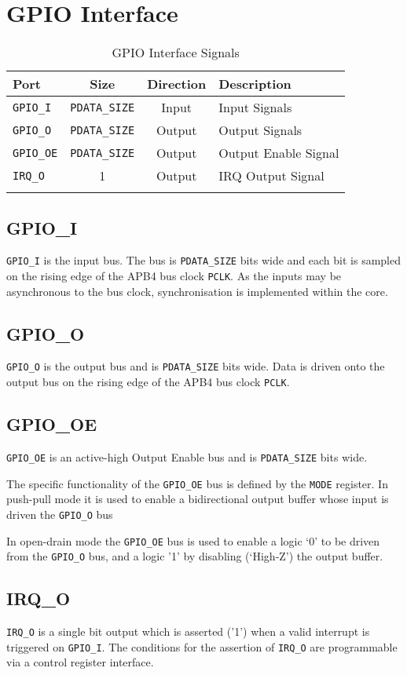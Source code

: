 \section{GPIO Interface}\label{gpio-interface}

\begin{longtable}[]{@{}lccl@{}}
\toprule
Port & Size & Direction & Description\tabularnewline
\midrule
\endhead
\texttt{GPIO\_I} & \texttt{PDATA\_SIZE} & Input & Input Signals\tabularnewline
\texttt{GPIO\_O} & \texttt{PDATA\_SIZE} & Output & Output Signals\tabularnewline
\texttt{GPIO\_OE} & \texttt{PDATA\_SIZE} & Output & Output Enable Signal\tabularnewline
\texttt{IRQ\_O} & 1 & Output & IRQ Output Signal\tabularnewline
\bottomrule
\caption{GPIO Interface Signals}
\end{longtable}

\subsection{GPIO\_I}\label{gpio_i}

\texttt{GPIO\_I} is the input bus. The bus is \texttt{PDATA\_SIZE} bits wide and each bit
is sampled on the rising edge of the APB4 bus clock \texttt{PCLK}. As the inputs
may be asynchronous to the bus clock, synchronisation is implemented
within the core.

\subsection{GPIO\_O}\label{gpio_o}

\texttt{GPIO\_O} is the output bus and is \texttt{PDATA\_SIZE} bits wide. Data is driven
onto the output bus on the rising edge of the APB4 bus clock \texttt{PCLK}.

\subsection{GPIO\_OE}\label{gpio_oe}

\texttt{GPIO\_OE} is an active-high Output Enable bus and is \texttt{PDATA\_SIZE} bits
wide.

The specific functionality of the \texttt{GPIO\_OE} bus is defined by the \texttt{MODE}
register. In push-pull mode it is used to enable a bidirectional output
buffer whose input is driven the \texttt{GPIO\_O} bus

In open-drain mode the \texttt{GPIO\_OE} bus is used to enable a logic `0' to be
driven from the \texttt{GPIO\_O} bus, and a logic '1' by disabling (`High-Z') the
output buffer.

\subsection{IRQ\_O}\label{irq_o}

\texttt{IRQ\_O} is a single bit output which is asserted ('1') when a valid interrupt is triggered on \texttt{GPIO\_I}. The conditions for the assertion of \texttt{IRQ\_O} are programmable via a control register interface.

